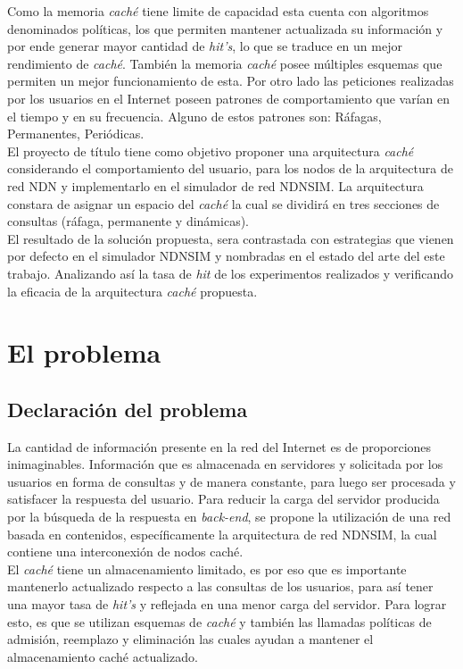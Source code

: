 \documentclass[12pt]{ociamthesis}  %
\begin{document}
Como la memoria \textit{caché} tiene limite de capacidad esta cuenta con algoritmos denominados políticas, los que permiten mantener actualizada su información y por ende generar mayor cantidad de \textit{hit's}, lo que se traduce en un mejor rendimiento de \textit{caché}. También la memoria \textit{caché} posee múltiples esquemas que permiten un mejor funcionamiento de esta. Por otro lado las peticiones realizadas por los usuarios en el Internet poseen patrones de comportamiento que varían en el tiempo y en su frecuencia. Alguno de estos patrones son: Ráfagas, Permanentes, Periódicas.\\

El proyecto de título tiene como objetivo proponer una arquitectura \textit{caché} considerando el comportamiento del usuario, para los nodos de la arquitectura de red NDN  y implementarlo en el simulador de red NDNSIM. La arquitectura constara de asignar un espacio del \textit{caché} la cual se dividirá en tres secciones de consultas (ráfaga, permanente y dinámicas).\\

El resultado de la solución propuesta, sera contrastada con estrategias que vienen por defecto en el simulador NDNSIM y nombradas en el estado del arte del este trabajo. Analizando así la tasa de \textit{hit} de los experimentos realizados y verificando la eficacia de la arquitectura \textit{caché} propuesta.\\

\section{El problema}

\subsection{Declaración del problema}
La cantidad de información presente en la red del Internet es de proporciones inimaginables. Información que es almacenada en servidores y solicitada por los usuarios en forma de consultas y de manera constante, para luego ser procesada y satisfacer la respuesta del usuario. Para reducir la carga del servidor producida por la búsqueda de la respuesta en \textit{back-end}, se propone la utilización de una red basada en contenidos, específicamente la arquitectura de red NDNSIM, la cual contiene una interconexión de nodos caché.\\

El \textit{caché} tiene un almacenamiento limitado, es por eso que es importante mantenerlo actualizado respecto a las consultas de los usuarios, para así tener una mayor tasa de \textit{hit's} y reflejada en una menor carga del servidor. Para lograr esto, es que se utilizan esquemas de \textit{caché} y también las llamadas políticas de admisión, reemplazo y eliminación las cuales ayudan a mantener el almacenamiento caché actualizado.\\
\end{document}
